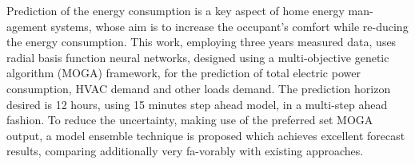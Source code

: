 Prediction of the energy consumption is a key aspect of home energy man-agement systems, whose aim is to increase the occupant's comfort while re-ducing the energy consumption. This work, employing three years measured data, uses radial basis function neural networks, designed using a multi-objective genetic algorithm (MOGA) framework, for the prediction of total electric power consumption, HVAC demand and other loads demand. The prediction horizon desired is 12 hours, using 15 minutes step ahead model, in a multi-step ahead fashion. To reduce the uncertainty, making use of the preferred set MOGA output, a model ensemble technique is proposed which achieves excellent forecast results, comparing additionally very fa-vorably with existing approaches.
